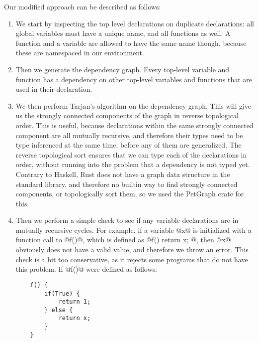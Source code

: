 Our modified approach can be described as follows:
\begin{enumerate}
    \item We start by inspecting the top level declarations on duplicate declarations: all global variables must have a unique name, and all functions as well. A function and a variable are allowed to have the same name though, because these are namespaced in our environment.
    \item Then we generate the dependency graph. Every top-level variable and function has a dependency on other top-level variables and functions that are used in their declaration.
    \item We then perform Tarjan's algorithm on the dependency graph. This will give us the strongly connected components of the graph in reverse topological order. This is useful, because declarations within the same strongly connected component are all mutually recursive, and therefore their types need to be type inferenced at the same time, before any of them are generalized. The reverse topological sort ensures that we can type each of the declarations in order, without running into the problem that a dependency is not typed yet. Contrary to Haskell, Rust does not have a graph data structure in the standard library, and therefore no builtin way to find strongly connected components, or topologically sort them, so we used the PetGraph crate \cite{petgraph} for this.
    \item Then we perform a simple check to see if any variable declarations are in mutually recursive cycles. For example, if a variable @x@ is initialized with a function call to @f()@, which is defined as @f() { return x; }@, then @x@ obviously does not have a valid value, and therefore we throw an error. This check is a bit too conservative, as it rejects some programs that do not have this problem. If @f()@ were defined as follows:
    
    \begin{lstlisting}
    f() {
        if(True) {
            return 1;
        } else {
            return x;
        }
    }
    \end{lstlisting}
    

\end{enumerate}
